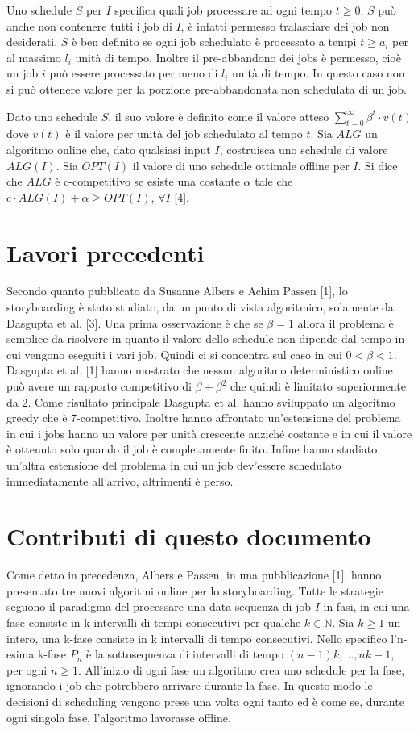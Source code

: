 \documentclass[12pt]{article}
\newcommand*{\N}{\mathbb{N}}
\begin{document}
Uno schedule $S$ per $I$ specifica quali job processare ad ogni tempo $t \geq 0$. $S$ può anche non contenere tutti i job di $I$, è infatti permesso tralasciare dei job non desiderati. $S$ è ben definito se ogni job schedulato è processato a tempi $t \geq a_{i}$ per al massimo $l_{i}$ unità di tempo. Inoltre il pre-abbandono dei jobs è permesso, cioè un job $i$ può essere processato per meno di $l_{i}$ unità di tempo. In questo caso non si può ottenere valore per la porzione pre-abbandonata non schedulata di un job. 

Dato uno schedule $S$, il suo valore è definito come il valore atteso $\sum_{t=0}^{\infty} \beta^{t}\cdot v(t)$ dove $v(t)$ è il valore per unità del job schedulato al tempo $t$. Sia $ALG$ un algoritmo online che, dato qualsiasi input $I$, costruisca uno schedule di valore $ALG(I)$. Sia $OPT(I)$ il valore di uno schedule ottimale offline per $I$. Si dice che $ALG$ è c-competitivo se esiste una costante $\alpha$ tale che $c \cdot ALG(I) + \alpha \geq OPT(I)$, $\forall I$ [4].

\section{Lavori precedenti}
Secondo quanto pubblicato da Susanne Albers e Achim Passen [1], lo storyboarding è stato studiato, da un punto di vista algoritmico, solamente da Dasgupta et al. [3]. Una prima osservazione è che se $\beta  = 1$ allora il problema è semplice da risolvere in quanto il valore dello schedule non dipende dal tempo in cui vengono eseguiti i vari job. Quindi ci si concentra sul caso in cui $0 < \beta < 1$.
Dasgupta et al. [1] hanno mostrato che nessun algoritmo deterministico online può avere un rapporto competitivo di $\beta + \beta^{2}$ che quindi è limitato superiormente da 2. Come risultato principale Dasgupta et al. hanno sviluppato un algoritmo greedy che è 7-competitivo. Inoltre hanno affrontato un’estensione del problema in cui i jobs hanno un valore per unità crescente anziché costante e in cui il valore è ottenuto solo quando il job è completamente finito. Infine hanno studiato un’altra estensione del problema in cui un job dev’essere schedulato immediatamente all’arrivo, altrimenti è perso.

\section{Contributi di questo documento}
Come detto in precedenza, Albers e Passen, in una pubblicazione [1], hanno presentato tre nuovi algoritmi online per lo storyboarding. Tutte le strategie seguono il paradigma del processare una data sequenza di job $I$ in fasi, in cui una fase consiste in k intervalli di tempi consecutivi per qualche $k\in \N$. 
Sia $k \geq 1$ un intero, una k-fase consiste in k intervalli di tempo consecutivi. Nello specifico l’n-esima k-fase $P_{n}$ è la sottosequenza di intervalli di tempo $(n-1)k,…,nk - 1$, per ogni $n \geq 1$. All’inizio di ogni fase un algoritmo crea uno schedule per la fase, ignorando i job che potrebbero arrivare durante la fase. In questo modo le decisioni di scheduling vengono prese una volta ogni tanto ed è come se, durante ogni singola fase, l'algoritmo lavorasse offline.
\end{document}
